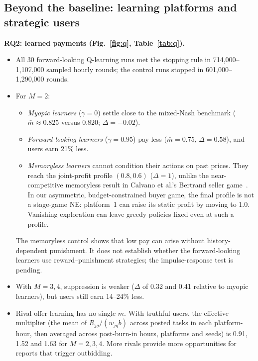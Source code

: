 \documentclass[12pt,draftcls,onecolumn]{IEEEtran}
\begin{document}
\subsection{Beyond the baseline: learning platforms and strategic users}
\textbf{RQ2: learned payments (Fig.~\ref{fig:q}, Table~\ref{tab:q}).}
\begin{itemize}
\item All 30 forward-looking Q-learning runs met the stopping rule in 714,000--1,107,000 sampled hourly rounds; the control runs stopped in 601,000--1,290,000 rounds.
\item For $M=2$:
  \begin{itemize}
  \item \emph{Myopic learners} ($\gamma=0$) settle close to the mixed-Nash benchmark ($\bar m\approx0.825$ versus 0.820; $\Delta=-0.02$).
  \item \emph{Forward-looking learners} ($\gamma=0.95$) pay less ($\bar m=0.75$, $\Delta=0.58$), and users earn 21\% less.
  \item \emph{Memoryless learners} cannot condition their actions on past prices. They reach the joint-profit profile $(0.8,0.6)$ ($\Delta=1$), unlike the near-competitive memoryless result in Calvano et al.'s Bertrand seller game~\cite{calvano2020ai}. In our asymmetric, budget-constrained buyer game, the final profile is not a stage-game NE: platform~1 can raise its static profit by moving to 1.0. Vanishing exploration can leave greedy policies fixed even at such a profile.
  \end{itemize}
  The memoryless control shows that low pay can arise without history-dependent punishment. It does not establish whether the forward-looking learners use reward--punishment strategies; the impulse-response test is pending.
\item With $M=3,4$, suppression is weaker ($\Delta$ of 0.32 and 0.41 relative to myopic learners), but users still earn 14--24\% less.
\item Rival-offer learning has no single $m$. With truthful users, the effective multiplier (the mean of $R_{jg}/(w_{jg}b)$ across posted tasks in each platform-hour, then averaged across post-burn-in hours, platforms and seeds) is 0.91, 1.52 and 1.63 for $M=2,3,4$. More rivals provide more opportunities for reports that trigger outbidding.
\end{itemize}
\end{document}
